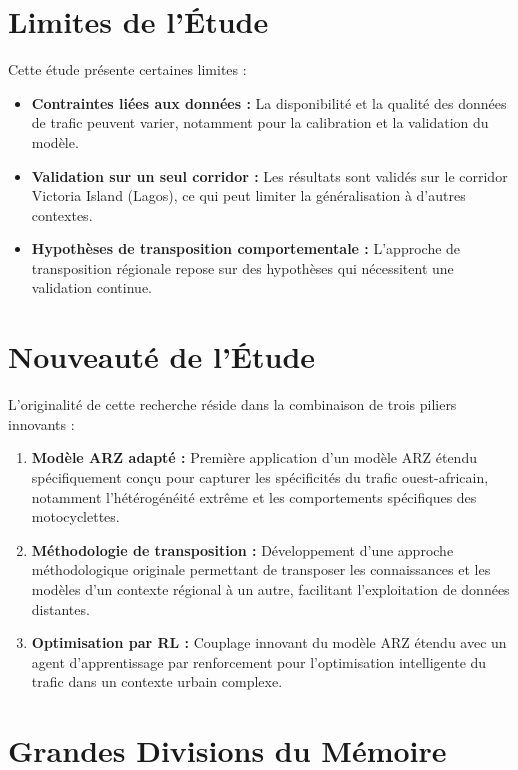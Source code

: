 \section{Limites de l'Étude}
\label{sec:limites_etude}

Cette étude présente certaines limites :
\begin{itemize}
    \item \textbf{Contraintes liées aux données :} La disponibilité et la qualité des données de trafic peuvent varier, notamment pour la calibration et la validation du modèle.
    \item \textbf{Validation sur un seul corridor :} Les résultats sont validés sur le corridor Victoria Island (Lagos), ce qui peut limiter la généralisation à d'autres contextes.
    \item \textbf{Hypothèses de transposition comportementale :} L'approche de transposition régionale repose sur des hypothèses qui nécessitent une validation continue.
\end{itemize}

\section{Nouveauté de l'Étude}
\label{sec:nouveaute_etude}

L'originalité de cette recherche réside dans la combinaison de trois piliers innovants :
\begin{enumerate}
    \item \textbf{Modèle ARZ adapté :} Première application d'un modèle ARZ étendu spécifiquement conçu pour capturer les spécificités du trafic ouest-africain, notamment l'hétérogénéité extrême et les comportements spécifiques des motocyclettes.
    \item \textbf{Méthodologie de transposition :} Développement d'une approche méthodologique originale permettant de transposer les connaissances et les modèles d'un contexte régional à un autre, facilitant l'exploitation de données distantes.
    \item \textbf{Optimisation par RL :} Couplage innovant du modèle ARZ étendu avec un agent d'apprentissage par renforcement pour l'optimisation intelligente du trafic dans un contexte urbain complexe.
\end{enumerate}

\section{Grandes Divisions du Mémoire}
\label{sec:divisions_memoire}

